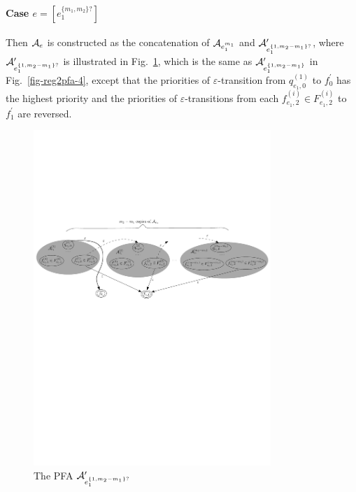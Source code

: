 \paragraph{Case $e = [e_1^{\{m_1,m_2\}?}]$} Then $\mathcal{A}_e$ is constructed as the concatenation of $\mathcal{A}_{e_1^{m_1}}$ and $\mathcal{A}^\prime_{e_1^{\{1,m_2-m_1\}?}}$, where $\mathcal{A}^\prime_{e_1^{\{1,m_2-m_1\}?}}$ is illustrated in Fig.~\ref{fig-reg2pfa-5}, which is the same as $\mathcal{A}^\prime_{e_1^{\{1,m_2-m_1\}}}$ in Fig.~\ref{fig-reg2pfa-4}, except that the priorities of $\varepsilon$-transition from $q^{(1)}_{e_1,0}$ to $f^\prime_0$ has the highest priority and  the priorities of $\varepsilon$-transitions from each $f^{(i)}_{e_1,2} \in F^{(i)}_{e_1,2}$ to $f^\prime_1$ are reversed.
		\begin{figure}[ht]
			\centering
			\includegraphics[width = 0.8\textwidth]{reg2pfa-5.pdf}
			\caption{The PFA $\mathcal{A}^\prime_{e_1^{\{1,m_2-m_1\}?}}$}
			\label{fig-reg2pfa-5}
		\end{figure}  

